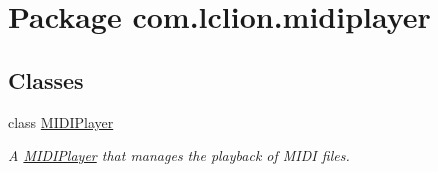 \hypertarget{namespacecom_1_1lclion_1_1midiplayer}{\section{Package com.\+lclion.\+midiplayer}
\label{namespacecom_1_1lclion_1_1midiplayer}
}
\subsection*{Classes}
\begin{DoxyCompactItemize}
\item 
class \hyperlink{classcom_1_1lclion_1_1midiplayer_1_1_m_i_d_i_player}{M\+I\+D\+I\+Player}
\begin{DoxyCompactList}\small\item\em A \hyperlink{classcom_1_1lclion_1_1midiplayer_1_1_m_i_d_i_player}{M\+I\+D\+I\+Player} that manages the playback of M\+I\+D\+I files. \end{DoxyCompactList}\end{DoxyCompactItemize}
